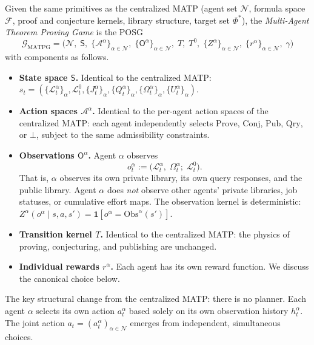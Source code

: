 \begin{definition}[MATPG]\label{def:matpg}
Given the same primitives as the centralized MATP (agent set $\mathcal{N}$, formula space $\mathcal{F}$, proof and conjecture kernels, library structure, target set $\Phi^*$), the \emph{Multi-Agent Theorem Proving Game} is the POSG
\[
\mathcal{G}_{\mathrm{MATPG}} = \Big(\mathcal{N},\;\mathsf{S},\;\{\mathcal{A}^\alpha\}_{\alpha\in\mathcal{N}},\;\{\mathsf{O}^\alpha\}_{\alpha\in\mathcal{N}},\;T,\;T^0,\;\{Z^\alpha\}_{\alpha\in\mathcal{N}},\;\{r^\alpha\}_{\alpha\in\mathcal{N}},\;\gamma\Big)
\]
with components as follows.
\begin{itemize}
    \item \textbf{State space $\mathsf{S}$.} Identical to the centralized MATP: $s_t = (\{\mathcal{L}^\alpha_t\}_\alpha,\mathcal{L}^0_t,\{J^\alpha_t\}_\alpha,\{Q^\alpha_t\}_\alpha,\{\Omega^\alpha_t\}_\alpha,\{U^\alpha_t\}_\alpha)$.
    
    \item \textbf{Action spaces $\mathcal{A}^\alpha$.} Identical to the per-agent action spaces of the centralized MATP: each agent independently selects $\mathrm{Prove}$, $\mathrm{Conj}$, $\mathrm{Pub}$, $\mathrm{Qry}$, or $\bot$, subject to the same admissibility constraints.
    
    \item \textbf{Observations $\mathsf{O}^\alpha$.} Agent $\alpha$ observes
    \[
    o^\alpha_t := \big(\mathcal{L}^\alpha_t,\;\Omega^\alpha_t;\;\mathcal{L}^0_t\big).
    \]
    That is, $\alpha$ observes its own private library, its own query responses, and the public library. Agent $\alpha$ does \emph{not} observe other agents' private libraries, job statuses, or cumulative effort maps. The observation kernel is deterministic: $Z^\alpha(o^\alpha\mid s,a,s') = \mathbf{1}[o^\alpha = \mathrm{Obs}^\alpha(s')]$.
    
    \item \textbf{Transition kernel $T$.} Identical to the centralized MATP: the physics of proving, conjecturing, and publishing are unchanged.
    
    \item \textbf{Individual rewards $r^\alpha$.} Each agent has its own reward function. We discuss the canonical choice below.
\end{itemize}
\end{definition}

The key structural change from the centralized MATP: there is no planner. Each agent $\alpha$ selects its own action $a^\alpha_t$ based solely on its own observation history $h^\alpha_t$. The joint action $a_t = (a^\alpha_t)_{\alpha\in\mathcal{N}}$ emerges from independent, simultaneous choices.


